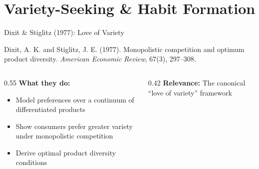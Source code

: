 \documentclass[aspectratio=169,professionalfonts]{beamer}
\newcommand{\hl}[1]{\textbf{\textcolor{UGARed}{#1}}}
\begin{document}
\section{Variety-Seeking \& Habit Formation}

\begin{frame}{Dixit \& Stiglitz (1977): Love of Variety}
  \begin{tcolorbox}[colback=red!5!white, colframe=UGARed, title=\textbf{Citation}]
    Dixit, A. K. and Stiglitz, J. E. (1977). Monopolistic competition and optimum
    product diversity. \textit{American Economic Review}, 67(3), 297--308.
  \end{tcolorbox}
  \vspace{6pt}
  \begin{columns}[T]
    \begin{column}{0.55\textwidth}
      \hl{What they do:}
      \begin{itemize}
        \item Model preferences over a continuum of differentiated products
        \item Show consumers prefer greater variety under monopolistic competition
        \item Derive optimal product diversity conditions
      \end{itemize}
    \end{column}
    \begin{column}{0.42\textwidth}
      \hl{Relevance:} The canonical ``love of variety'' framework
    \end{column}
  \end{columns}
\end{frame}
\end{document}
